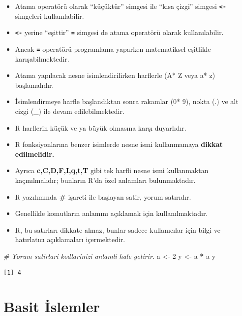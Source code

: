 \documentclass[
  oneside]{book}
\newenvironment{Shaded}{\begin{snugshade}}{\end{snugshade}}
\newcommand{\CommentTok}[1]{\textcolor[rgb]{0.56,0.35,0.01}{\textit{#1}}}
\newcommand{\DecValTok}[1]{\textcolor[rgb]{0.00,0.00,0.81}{#1}}
\newcommand{\NormalTok}[1]{#1}
\newcommand{\OtherTok}[1]{\textcolor[rgb]{0.56,0.35,0.01}{#1}}
\newcommand{\SpecialCharTok}[1]{\textcolor[rgb]{0.81,0.36,0.00}{\textbf{#1}}}
\begin{document}
\begin{itemize}
\item
  Atama operatörü olarak ``küçüktür'' simgesi ile ``kısa çizgi'' simgesi \textbf{\texttt{\textless{}-}} simgeleri kullanılabilir.
\item
  \textbf{\texttt{\textless{}-}} yerine ``eşittir'' \textbf{\texttt{=}} simgesi de atama operatörü olarak kullanılabilir.
\item
  Ancak \textbf{\texttt{=}} operatörü programlama yaparken matematiksel eşitlikle karışabilmektedir.
\item
  Atama yapılacak nesne isimlendirilirken harflerle (A* Z veya a* z) başlamalıdır.
\item
  İsimlendirmeye harfle başlandıktan sonra rakamlar (0* 9), nokta (.) ve alt cizgi (\_) ile devam edilebilmektedir.
\item
  R harflerin küçük ve ya büyük olmasına karşı duyarlıdır.
\item
  R fonksiyonlarına benzer isimlerde nesne ismi kullanmamaya \textbf{dikkat edilmelidir.}
\item
  Ayrıca \textbf{c,C,D,F,I,q,t,T} gibi tek harfli nesne ismi kullanmaktan kaçınılmalıdır; bunların R'da özel anlamları bulunmaktadır.
\item
  R yazılımında \textbf{\#} işareti ile başlayan satir, yorum satırıdır.
\item
  Genellikle komutların anlamını açıklamak için kullanılmaktadır.
\item
  R, bu satırları dikkate almaz, bunlar sadece kullanıcılar için bilgi ve hatırlatıcı açıklamaları içermektedir.
\end{itemize}

\begin{Shaded}
\begin{Highlighting}[]
\CommentTok{\# Yorum satirlari kodlarinizi anlamli hale getirir.}
\NormalTok{a }\OtherTok{\textless{}{-}}  \DecValTok{2}
\NormalTok{y }\OtherTok{\textless{}{-}}\NormalTok{  a }\SpecialCharTok{*}\NormalTok{ a}
\NormalTok{y}
\end{Highlighting}
\end{Shaded}

\begin{verbatim}
[1] 4
\end{verbatim}

\hypertarget{basit-islemler}{%
\section{Basit İslemler}\label{basit-islemler}}
\end{document}
